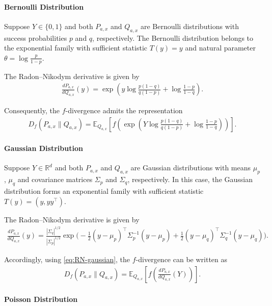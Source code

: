 \paragraph{Bernoulli Distribution}
Suppose $Y\in\{0,1\}$ and both $P_{a,x}$ and $Q_{a,x}$ are Bernoulli distributions with success probabilities $p$ and $q$, respectively.
The Bernoulli distribution belongs to the exponential family with sufficient statistic $T(y)=y$ and natural parameter $\theta=\log\frac{p}{1-p}$.

The Radon--Nikodym derivative is given by
\begin{align}
    \frac{dP_{a,x}}{dQ_{a,x}}(y) = \exp\left( y \log \frac{p(1-q)}{q(1-p)} + \log \frac{1-p}{1-q} \right).
\end{align}

Consequently, the $f$-divergence admits the representation
\begin{align}
    D_f(P_{a,x}\|Q_{a,x}) = \mathbb{E}_{Q_{a,x}}\!\left[ f\left( \exp\left( Y \log \frac{p(1-q)}{q(1-p)} + \log \frac{1-p}{1-q} \right) \right) \right].
\end{align}

\paragraph{Gaussian Distribution}
Suppose $Y\in\mathbb{R}^d$ and both $P_{a,x}$ and $Q_{a,x}$ are Gaussian distributions with means $\mu_p$, $\mu_q$ and covariance matrices $\Sigma_p$ and $\Sigma_q$, respectively.
In this case, the Gaussian distribution forms an exponential family with sufficient statistic $T(y)=(y, yy^\top)$.

The Radon--Nikodym derivative is given by
\begin{align} \label{eq:RN-gaussian}
    \frac{dP_{a,x}}{dQ_{a,x}}(y) = \frac{|\Sigma_q|^{1/2}}{|\Sigma_p|^{1/2}} \exp\Bigg( -\frac12 (y-\mu_p)^\top \Sigma_p^{-1}(y-\mu_p) + \frac12 (y-\mu_q)^\top \Sigma_q^{-1}(y-\mu_q) \Bigg).
\end{align}

Accordingly, using \eqref{eq:RN-gaussian}, the $f$-divergence can be written as
\begin{align}
    D_f(P_{a,x}\|Q_{a,x}) = \mathbb{E}_{Q_{a,x}}\!\left[ f\!\left( \frac{dP_{a,x}}{dQ_{a,x}}(Y) \right) \right].
\end{align}


\paragraph{Poisson Distribution}

